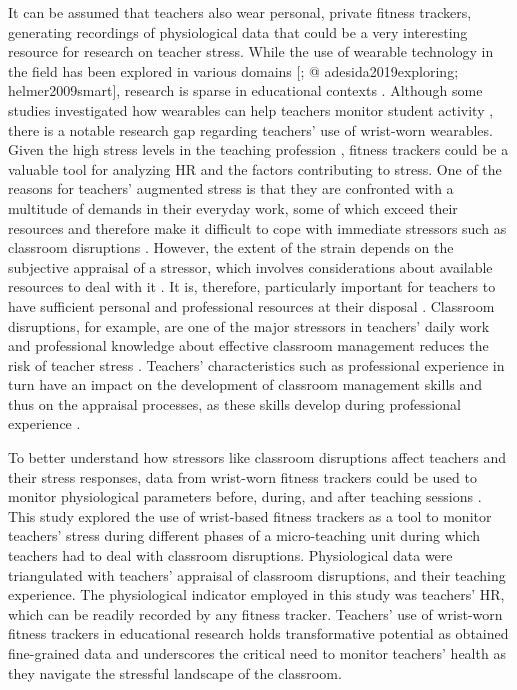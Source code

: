 \documentclass[preprint, 3p,
authoryear]{elsarticle} %
\begin{document}
It can be assumed that teachers also wear personal, private fitness
trackers, generating recordings of physiological data that could be a
very interesting resource for research on teacher stress. While the use
of wearable technology in the field has been explored in various domains
{[}\citet{hughes2023wearable}; @ adesida2019exploring;
helmer2009smart{]}, research is sparse in educational contexts
\citep{de2017towards}. Although some studies investigated how wearables
can help teachers monitor student activity \citep{quintana2016keeping},
there is a notable research gap regarding teachers' use of wrist-worn
wearables. Given the high stress levels in the teaching profession
\citep{johnson2005experience}, fitness trackers could be a valuable tool
for analyzing HR and the factors contributing to stress. One of the
reasons for teachers' augmented stress is that they are confronted with
a multitude of demands in their everyday work, some of which exceed
their resources and therefore make it difficult to cope with immediate
stressors such as classroom disruptions \citep{montgomery2005meta}.
However, the extent of the strain depends on the subjective appraisal of
a stressor, which involves considerations about available resources to
deal with it \citep{kyriacou2001}. It is, therefore, particularly
important for teachers to have sufficient personal and professional
resources at their disposal \citep{cramer2018belastung}. Classroom
disruptions, for example, are one of the major stressors in teachers'
daily work \citep{boyle1995structural, aloe2014multivariate} and
professional knowledge about effective classroom management reduces the
risk of teacher stress \citep{klusmann2012berufliche}. Teachers'
characteristics such as professional experience in turn have an impact
on the development of classroom management skills and thus on the
appraisal processes, as these skills develop during professional
experience \citep{ophardt2017klassenmanagement, wolff2015keeping}.

To better understand how stressors like classroom disruptions affect
teachers and their stress responses, data from wrist-worn fitness
trackers could be used to monitor physiological parameters before,
during, and after teaching sessions \citep{wettstein2021}. This study
explored the use of wrist-based fitness trackers as a tool to monitor
teachers' stress during different phases of a micro-teaching unit during
which teachers had to deal with classroom disruptions. Physiological
data were triangulated with teachers' appraisal of classroom
disruptions, and their teaching experience. The physiological indicator
employed in this study was teachers' HR, which can be readily recorded
by any fitness tracker. Teachers' use of wrist-worn fitness trackers in
educational research holds transformative potential as obtained
fine-grained data and underscores the critical need to monitor teachers'
health as they navigate the stressful landscape of the classroom.
\end{document}
